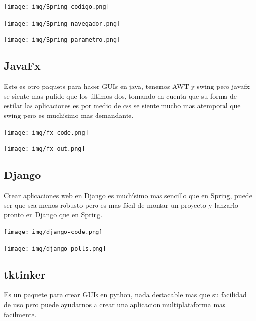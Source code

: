 \documentclass[12pt]{article}
\begin{document}
\begin{center}
\texttt{[image: img/Spring-codigo.png]}
\end{center}

\begin{center}
\texttt{[image: img/Spring-navegador.png]}
\end{center}

\begin{center}
\texttt{[image: img/Spring-parametro.png]}
\end{center}

\subsection*{JavaFx}
\label{sec:org9558c5f}
Este es otro paquete para hacer GUIs en java, tenemos AWT y swing pero javafx se siente mas pulido que los últimos dos, tomando en cuenta que su forma de estilar las aplicaciones es por medio de css se siente mucho mas atemporal que swing pero es muchísimo mas demandante. 

\begin{center}
\texttt{[image: img/fx-code.png]}
\end{center}

\begin{center}
\texttt{[image: img/fx-out.png]}
\end{center}

\subsection*{Django}
\label{sec:orga70b640}
Crear aplicaciones web en Django es muchísimo mas sencillo que en Spring, puede ser que sea menos robusto pero es mas fácil de montar un proyecto y lanzarlo pronto en Django que en Spring. 

\begin{center}
\texttt{[image: img/django-code.png]}
\end{center}

\begin{center}
\texttt{[image: img/django-polls.png]}
\end{center}

\subsection*{tktinker}
\label{sec:org3c795b9}
Es un paquete para crear GUIs en python, nada destacable mas que su facilidad de uso pero puede ayudarnos a crear una aplicacion multiplataforma mas facilmente.
\end{document}
